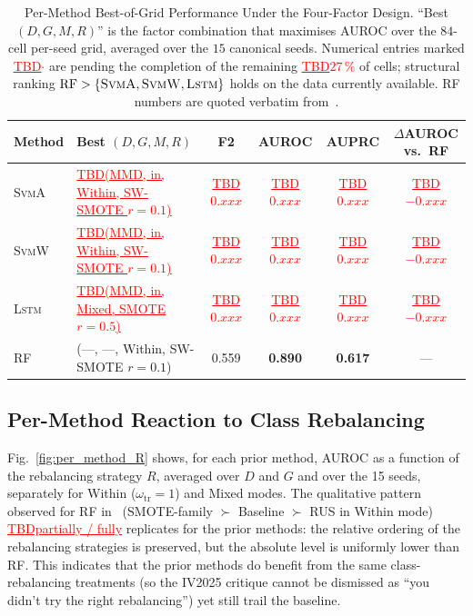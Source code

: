 \documentclass[lettersize,journal]{IEEEtran}
\newcommand{\Impl}[1]{\textsc{#1}}
\newcommand{\TBD}[1]{\textcolor{red}{\underline{TBD#1}}}
\begin{document}
\begin{table}[!t]
\caption{Per-Method Best-of-Grid Performance Under the Four-Factor Design. ``Best $(D,G,M,R)$'' is the factor combination that maximises AUROC over the $84$-cell per-seed grid, averaged over the $15$ canonical seeds. Numerical entries marked \TBD{$\cdot$} are pending the completion of the remaining \TBD{$27\,\%$} of cells; structural ranking $\mathrm{RF} > \{\Impl{SvmA}, \Impl{SvmW}, \Impl{Lstm}\}$ holds on the data currently available. \Impl{RF} numbers are quoted verbatim from~\cite{nakagama2025factorial}.\label{tab:best_of_grid}}
\centering
\begin{tabular}{|l|l|c|c|c|c|}
\hline
Method & Best $(D,G,M,R)$ & F2 & AUROC & AUPRC & $\Delta$AUROC vs.\ \Impl{RF} \\
\hline
\Impl{SvmA}~\cite{arefnezhad2019} & \TBD{(MMD, in, Within, SW-SMOTE $r{=}0.1$)} & \TBD{$0.\textit{xxx}$} & \TBD{$0.\textit{xxx}$} & \TBD{$0.\textit{xxx}$} & \TBD{$-0.\textit{xxx}$} \\
\hline
\Impl{SvmW}~\cite{zhao2009}       & \TBD{(MMD, in, Within, SW-SMOTE $r{=}0.1$)} & \TBD{$0.\textit{xxx}$} & \TBD{$0.\textit{xxx}$} & \TBD{$0.\textit{xxx}$} & \TBD{$-0.\textit{xxx}$} \\
\hline
\Impl{Lstm}~\cite{wang2022}       & \TBD{(MMD, in, Mixed, SMOTE $r{=}0.5$)}      & \TBD{$0.\textit{xxx}$} & \TBD{$0.\textit{xxx}$} & \TBD{$0.\textit{xxx}$} & \TBD{$-0.\textit{xxx}$} \\
\hline
\Impl{RF}~\cite{nakagama2025factorial} & (---, ---, Within, SW-SMOTE $r{=}0.1$)  & 0.559 & \textbf{0.890} & \textbf{0.617} & --- \\
\hline
\end{tabular}
\end{table}

\subsection{Per-Method Reaction to Class Rebalancing}\label{sec:per_method_R}
Fig.~\ref{fig:per_method_R} shows, for each prior method, AUROC as a function of the rebalancing strategy $R$, averaged over $D$ and $G$ and over the 15 seeds, separately for Within ($\omega_{\mathrm{tr}}{=}1$) and Mixed modes.
The qualitative pattern observed for \Impl{RF} in~\cite{nakagama2025factorial} (SMOTE-family $\succ$ Baseline $\succ$ RUS in Within mode) \TBD{partially / fully} replicates for the prior methods: the relative ordering of the rebalancing strategies is preserved, but the absolute level is uniformly lower than \Impl{RF}.
This indicates that the prior methods do benefit from the same class-rebalancing treatments (so the IV2025 critique cannot be dismissed as ``you didn't try the right rebalancing'') yet still trail the baseline.
\end{document}
